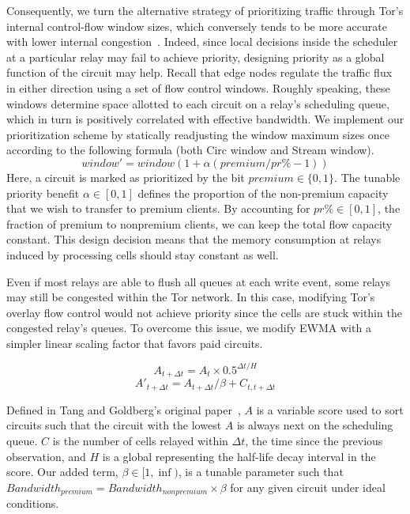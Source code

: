 Consequently, we turn the alternative strategy of prioritizing traffic through Tor's internal control-flow window sizes, which conversely tends to be more accurate with lower internal congestion~\cite{archive-2009-mail, kiraly2008solving}.
Indeed, since local decisions inside the scheduler at a particular relay may fail to achieve priority, designing priority as a global function of the circuit may help.
Recall that edge nodes regulate the traffic flux in either direction using a set of flow control windows.
Roughly speaking, these windows determine space allotted to each circuit on a relay's scheduling queue, which in turn is positively correlated with effective bandwidth.
We implement our prioritization scheme by statically readjusting the window maximum sizes once according to the following formula (both Circ window and Stream window).
\begin{equation} window' = window(1+ \alpha(premium / pr\% - 1)) \label{eq:flow} \end{equation} Here, a circuit is marked as prioritized by the bit $premium \in \{0, 1\}$.
The tunable priority benefit $\alpha \in [0, 1]$ defines the proportion of the non-premium capacity that we wish to transfer to premium clients.
By accounting for $pr\% \in [0,1]$, the fraction of premium to nonpremium clients, we can keep the total flow capacity constant.
This design decision means that the memory consumption at relays induced by processing cells should stay constant as well.

Even if most relays are able to flush all queues at each write event, some relays may still be congested within the Tor network.
In this case, modifying Tor's overlay flow control would not achieve priority since the cells are stuck within the congested relay's queues.
To overcome this issue, we modify EWMA with a simpler linear scaling factor that favors paid circuits.

\begin{equation}
  A_{t + \Delta t} = A_t \times 0.5^{\Delta t/H}
\end{equation}
\begin{equation}
  A'_{t + \Delta t} = A_{t + \Delta t} / \beta + C_{t, t + \Delta t}
\end{equation}

Defined in Tang and Goldberg's original paper~\cite{tang2010improved}, $A$ is a variable score used to sort circuits such that the circuit with the lowest $A$ is always next on the scheduling queue.
$C$ is the number of cells relayed within $\Delta t$, the time since the previous observation, and $H$ is a global representing the half-life decay interval in the score.
Our added term, $\beta \in [1, \inf)$, is a tunable parameter such that $\mathit{Bandwidth}_{\mathit{premium}} = \mathit{Bandwidth}_{\mathit{nonpremium}} \times \beta$ for any given circuit under ideal conditions.

